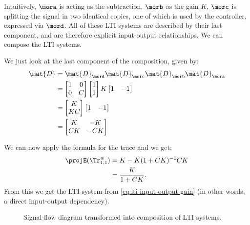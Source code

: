 \begin{example}
        Intuitively, $\mora$ is acting as the subtraction, $\morb$ as the gain $K$, $\morc$ is splitting the signal in two identical copies, one of which is used by the controller, expressed via $\mord$.
        All of these LTI systems are described by their last component, and are therefore explicit input-output relationships.
        We can compose the LTI systems.

        We just look at the last component of the composition, given by:
        \begin{equation*}
            \begin{aligned}
                \mat{D} & =\mat{D}_\mord \mat{D}_\morc \mat{D}_\morb \mat{D}_\mora \\
                        & =\begin{bmatrix}1 & 0\\ 0 & {C}\end{bmatrix} \begin{bmatrix} 1\\ 1 \end{bmatrix} K \begin{bmatrix} 1 & -1 \end{bmatrix} \\
                        & =\begin{bmatrix}K \\ {KC}\end{bmatrix}\begin{bmatrix} 1 & -1 \end{bmatrix} \\
                        & =\begin{bmatrix}
                               K  & -K  \\
                               CK & -CK
                           \end{bmatrix}
            \end{aligned}
        \end{equation*}

        We can now apply the formula for the trace and we get:
        \begin{equation*}
            \begin{aligned}
                \projE(\Tr_{1,1}^{w}) & =K - K(1+CK)^{-1}
                CK \\
                                      & =\frac{K}{1+CK}.
            \end{aligned}
        \end{equation*}
        From this we get the LTI system from \cref{eq:lti-input-output-gain} (in other words, a direct input-output dependency).

        \begin{marginfigure}
            \begin{center}
            \end{center}
            \caption{Example with signal-flow diagram.}
            \label{fig:lti-ex-signalflow}
        \end{marginfigure}
    \end{example}

    \begin{figure}
        \centering
        \caption{Signal-flow diagram transformed into composition of LTI systems.}
        \label{fig:lti-ex-signalflow-bis}
    \end{figure}


